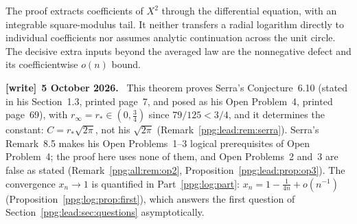 \documentclass[11pt,letterpaper]{article}
\theoremstyle{remark}\newtheorem{remark}[theorem]{Remark}
\numberwithin{equation}{section}
\newenvironment{writenote}[1][]{\par\smallskip\begingroup\small
 \noindent\textbf{[write]}\if\relax\detokenize{#1}\relax\else~\textbf{#1.}\fi\ }%
 {\par\endgroup\smallskip}
\begin{document}
The proof extracts coefficients of $X^2$ through the differential equation, with an integrable square-modulus tail. It neither transfers a radial logarithm directly to individual coefficients nor assumes analytic continuation across the unit circle. The decisive extra inputs beyond the averaged law are the nonnegative defect and its coefficientwise $o(n)$ bound.
\begin{writenote}[5 October 2026]
This theorem proves Serra's Conjecture~6.10 (stated in his Section~1.3, printed page~7, and posed as his Open Problem~4, printed page~69), with $r_\infty=r_*\in(0,\frac34)$ since $79/125<3/4$, and it determines the constant: $C=r_*\sqrt{2\pi}$, not his $\sqrt{2\pi}$ (Remark~\ref{ppg:lead:rem:serra}). Serra's Remark~8.5 makes his Open Problems~1--3 logical prerequisites of Open Problem~4; the proof here uses none of them, and Open Problems~2 and~3 are false as stated (Remark~\ref{ppg:all:rem:op2}, Proposition~\ref{ppg:lead:prop:op3}). The convergence $x_n\to1$ is quantified in Part~\ref{ppg:log:part}: $x_n=1-\frac1{4n}+o(n^{-1})$ (Proposition~\ref{ppg:log:prop:first}), which answers the first question of Section~\ref{ppg:lead:sec:questions} asymptotically.
\end{writenote}
\end{document}
